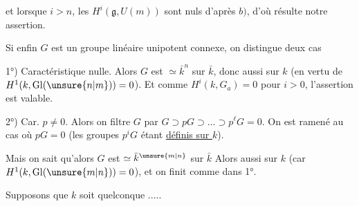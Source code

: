 
et lorsque $i>n$, les  $H^i(\mathfrak g,U(m))$ sont nuls d'après $b)$,  d'où résulte notre assertion.

Si enfin $G$ est  un groupe linéaire unipotent connexe, on distingue deux cas

1°) Caractéristique nulle. Alors $G$ est $\simeq\bar k^n$ sur $\bar k$, donc aussi sur $k$ (en vertu de $H^1(k,\operatorname{Gl}(\unsure{n|m}))=0$). Et comme $H^i(k,G_a)=0$ pour $i>0$, l'assertion est valable.

2°) Car. $p\ne0$. Alors on filtre $G$ par $G\supset pG\supset\ldots\supset p^\ell G=0$. On est ramené au cas où $pG=0$ (les groupes $p^iG$ étant \uline{définis sur $k$}).

\margin{$//$}

Mais on sait qu'alors $G$ est $\simeq\bar k^{\unsure{m|n}}$ sur $\bar k$ Alors \deleted{\unsure{=|\simeq}} aussi sur $k$ (car $H^1(k,\operatorname{Gl}(\unsure{m|n}))=0$), et on finit comme dans 1°.

Supposons que $k$ soit quelconque .....


